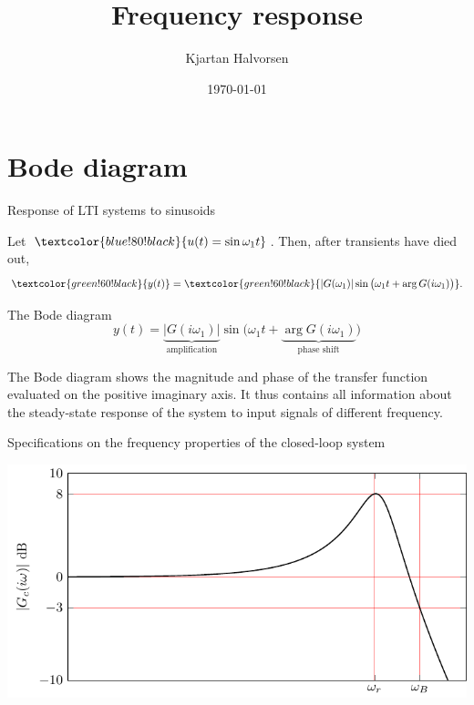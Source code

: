 \documentclass[presentation,aspectratio=169]{beamer}
\author{Kjartan Halvorsen}
\date{\today}
\title{Frequency response}
\def\ucolor{blue!80!black}
\def\ycolor{green!60!black}
\newcommand*{\incolor}[1]{\textcolor{\ucolor}{#1}}
\newcommand*{\outcolor}[1]{\textcolor{\ycolor}{#1}}
\begin{document}
\maketitle

\section{Bode diagram}
\label{sec:org30472a2}

\begin{frame}[label={sec:org2c8c6d5}]{Response of LTI systems to sinusoids}
\begin{center}
\end{center}

Let \(\incolor{u(t) = \sin\omega_1 t}\). Then, after transients have died out,
\[ \outcolor{y(t)}= \outcolor{|G(\omega_1)| \sin \big( \omega_1 t + \arg G(i\omega_1)\big)}. \]
\end{frame}


\begin{frame}[label={sec:orgd7e24dc}]{The Bode diagram}
\[ y(t) = \underbrace{|G(i\omega_1)|}_{\text{amplification}} \sin \big( \omega_1 t + \underbrace{\arg G(i\omega_1)}_{\text{phase shift}} \big) \]

The Bode diagram shows the \alert{magnitude} and \alert{phase} of the transfer function evaluated on the positive imaginary axis. It thus contains all information about the steady-state response of the system to input signals of different frequency.
\end{frame}


\begin{frame}[label={sec:org8f5caea}]{Specifications on the frequency properties of the closed-loop system}
\begin{center}
\includegraphics[width=0.899\linewidth]{../../figures/spec-bode-closed-loop-new}
\end{center}
\end{frame}
\end{document}
